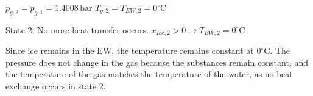 \( p_{g,2} = p_{g,1} = 1.4008 \, \text{bar} \)  
\( T_{g,2} = T_{EW,2} = 0^\circ \text{C} \)  

State 2: No more heat transfer occurs.  
\( x_{Ice,2} > 0 \rightarrow T_{EW,2} = 0^\circ \text{C} \)  

Since ice remains in the EW, the temperature remains constant at \( 0^\circ \text{C} \). The pressure does not change in the gas because the substances remain constant, and the temperature of the gas matches the temperature of the water, as no heat exchange occurs in state 2.